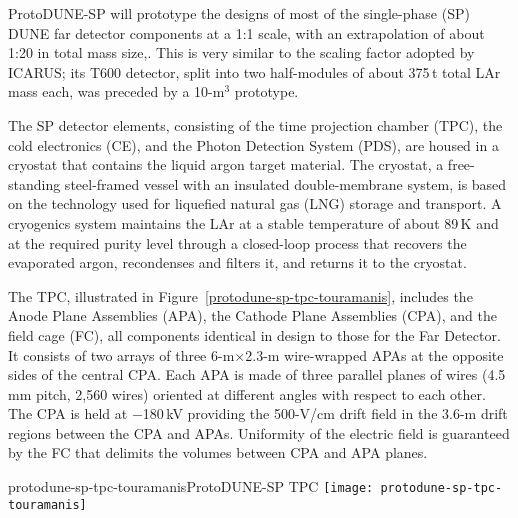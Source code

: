 ProtoDUNE-SP will prototype the designs of most of the single-phase (SP) DUNE far detector components at a 1:1 scale, with an extrapolation of about 1:20 in total mass size,.  This is very similar to the scaling factor adopted %
by ICARUS; its T600 detector, split into two half-modules of about 375\,t total LAr mass each, was preceded by a 10-m$^3$ prototype.


The SP detector elements, consisting of the time projection chamber (TPC), the cold electronics (CE), and the Photon Detection System (PDS), are housed in a cryostat that contains the liquid argon target material. The cryostat, a free-standing steel-framed vessel with an insulated double-membrane system, is based on the technology used for liquefied natural gas (LNG) storage and transport. %
A cryogenics system maintains the LAr at a stable temperature of about 89\,K and at the required purity level through a closed-loop process that recovers the evaporated argon, recondenses and filters it, and returns it to the cryostat. 


The TPC, illustrated in Figure~\ref{protodune-sp-tpc-touramanis}, includes the Anode Plane Assemblies (APA), the Cathode Plane Assemblies (CPA), and the field cage (FC), all components identical in design to those for the Far Detector. It consists of two arrays of three 6-m$\times$2.3-m wire-wrapped APAs at the opposite sides of the central CPA. Each APA is made of three parallel planes of wires (4.5 mm pitch, 2,560 wires) 
oriented at different angles with respect to each other. The CPA is held at $-$180\,kV providing the 500-V/cm drift field in the 3.6-m drift regions between the CPA and APAs. %
Uniformity of the electric field is guaranteed by the FC that delimits the volumes between CPA and APA planes.

\begin{cdrfigure}{protodune-sp-tpc-touramanis}{ProtoDUNE-SP TPC}
\texttt{[image: protodune-sp-tpc-touramanis]}
\end{cdrfigure}

